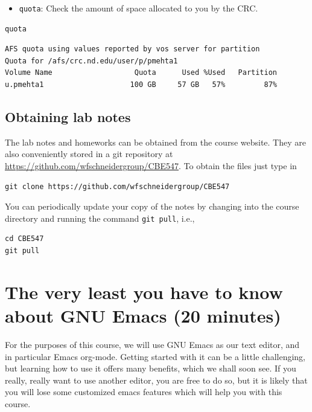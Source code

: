 \documentclass[11pt]{article}
\begin{document}
\begin{itemize}
\item \verb~quota~: Check the amount of space allocated to you by the CRC.
\end{itemize}

\begin{verbatim}
quota
\end{verbatim}

\begin{verbatim}
AFS quota using values reported by vos server for partition
Quota for /afs/crc.nd.edu/user/p/pmehta1 
Volume Name                   Quota      Used %Used   Partition
u.pmehta1                    100 GB     57 GB   57%         87%
\end{verbatim}


\subsection{Obtaining lab notes}
\label{sec-1-3}

The lab notes and homeworks can be obtained from the course website. They are also conveniently stored in a git repository at \url{https://github.com/wfschneidergroup/CBE547}. To obtain the files just type in

\begin{verbatim}
git clone https://github.com/wfschneidergroup/CBE547
\end{verbatim}


You can periodically update your copy of the notes by changing into the course directory and running the command \verb~git pull~, i.e.,

\begin{verbatim}
cd CBE547
git pull
\end{verbatim}


\section{The very least you have to know about GNU Emacs (20 minutes)}
\label{sec-2}

For the purposes of this course, we will use GNU Emacs as our text editor, and in particular Emacs org-mode. Getting started with it can be a little challenging, but learning how to use it offers many benefits, which we shall soon see. If you really, really want to use another editor, you are free to do so, but it is likely that you will lose some customized emacs features which will help you with this course.
\end{document}
